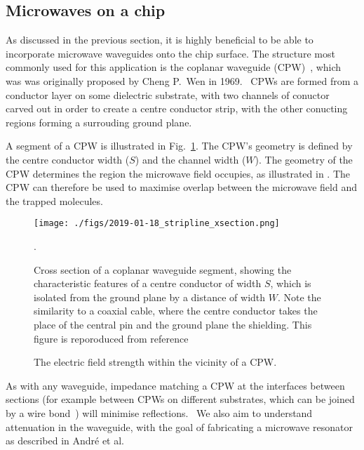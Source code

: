 
\subsection{Microwaves on a chip}

As discussed in the previous section, it is highly beneficial to be able to
incorporate microwave waveguides onto the chip surface. The structure most
commonly used for this application is the coplanar waveguide (CPW)~\cite{},
which was was originally proposed by Cheng P.~Wen in 1969.~\cite{1127105} CPWs
are formed from a conductor layer on some dielectric substrate, with two
channels of conuctor carved out in order to create a centre conductor strip,
with the other conucting regions forming a surrouding ground plane.

A segment of a CPW is illustrated in Fig.~\ref{experiment:fig:CPWxsec}. The
CPW's geometry is defined by the centre conductor width ($S$) and the channel
width ($W$). The geometry of the CPW determines the region the microwave field
occupies, as illustrated in . The CPW can
therefore be used to maximise overlap between the microwave field and the
trapped molecules.

\begin{figure}
  \texttt{[image: ./figs/2019-01-18\_stripline\_xsection.png]}
  \caption{
    Cross section of a coplanar waveguide segment, showing the characteristic
    features of a centre conductor of width $S$, which is isolated from the
    ground plane by a distance of width $W$. Note the similarity to a coaxial
    cable, where the centre conductor takes the place of the central pin and the
    ground plane the shielding. This figure is reporoduced from
    reference~\cite{Simons2004}}.
  \label{experiment:fig:CPWxsec}
\end{figure}


\begin{figure}
  \caption{
    The  electric field strength within the vicinity of a CPW.
  }
  \label{experiment:fig:CPWfield}
\end{figure}

As with any waveguide, impedance matching a CPW at the interfaces between
sections (for example between CPWs on different substrates, which can be joined
by a wire bond~\cite{rohtua}) will minimise reflections.~\cite{Jackson1975} We
also aim to understand attenuation in the waveguide, with the goal of
fabricating a microwave resonator as described in Andr\'e et
al.~\cite{Andre2006}

